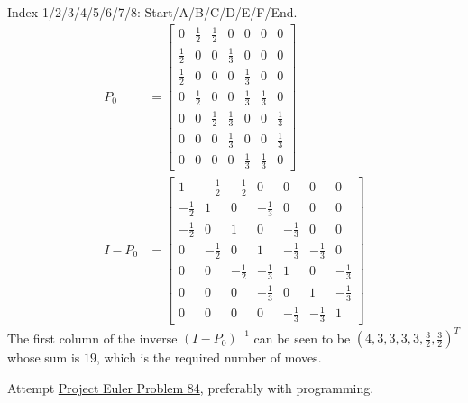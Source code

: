 \begin{Answer}
Index 1/2/3/4/5/6/7/8: Start/A/B/C/D/E/F/End. 
\begin{align*}
P_0 &=
\begin{bmatrix}
0 & \frac{1}{2} & \frac{1}{2} & 0 & 0 & 0 & 0\\
\frac{1}{2} & 0 & 0 & \frac{1}{3} & 0 & 0 & 0\\
\frac{1}{2} & 0 & 0 & 0 & \frac{1}{3} & 0 & 0\\
0 & \frac{1}{2} & 0 & 0 & \frac{1}{3} & \frac{1}{3} & 0\\
0 & 0 & \frac{1}{2} & \frac{1}{3} & 0 & 0 & \frac{1}{3}\\
0 & 0 & 0 & \frac{1}{3} & 0 & 0 & \frac{1}{3}\\
0 & 0 & 0 & 0 & \frac{1}{3} & \frac{1}{3} & 0
\end{bmatrix} \\
I - P_0 &= 
\begin{bmatrix}
1&-\frac{1}{2}&-\frac{1}{2}&0&0&0&0\\ 
-\frac{1}{2}&1&0&-\frac{1}{3}&0&0&0\\ 
-\frac{1}{2}&0&1&0&-\frac{1}{3}&0&0\\ 
0&-\frac{1}{2}&0&1&-\frac{1}{3}&-\frac{1}{3}&0\\ 
0&0&-\frac{1}{2}&-\frac{1}{3}&1&0&-\frac{1}{3}\\ 
0&0&0&-\frac{1}{3}&0&1&-\frac{1}{3}\\ 
0&0&0&0&-\frac{1}{3}&-\frac{1}{3}&1
\end{bmatrix} 
\end{align*}
The first column of the inverse $(I - P_0)^{-1}$ can be seen to be $(4,3,3,3,3,\frac{3}{2},\frac{3}{2})^T$ whose sum is $19$, which is the required number of moves.
\end{Answer}

\begin{Exercise}
Attempt \href{https://projecteuler.net/problem=84}{Project Euler Problem 84}, preferably with programming.
\end{Exercise}